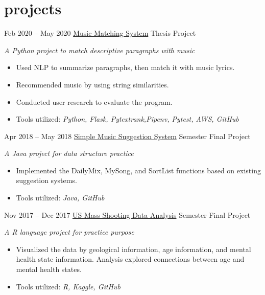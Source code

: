 \documentclass[]{friggeri-cv}
\begin{document}
\section{projects}
\begin{entrylist}
  \entry
    {Feb 2020 -- May 2020}
    {\href{https://github.com/liux2/Allegheny-College-CMPSC-COMP-liux2}{Music Matching System}}
    {Thesis Project}
    {\emph{A Python project to match descriptive paragraphs with music}
    \begin{itemize}[leftmargin=1.2em]
    \item Used NLP to summarize paragraphs, then match it with music lyrics.
    \item Recommended music by using string similarities.
    \item Conducted user research to evaluate the program.
    \item Tools utilized: \emph{Python, Flask, Pytextrank,Pipenv, Pytest, AWS, GitHub}
    \end{itemize}}
  \entry
    {Apr 2018 -- May 2018}
    {\href{https://github.com/TravisThomasAC/cs250-FinalProject-Team9}{Simple Music Suggestion System}}
    {Semester Final Project}
    {\emph{A Java project for data structure practice}
    \begin{itemize}[leftmargin=1.2em]
    \item Implemented the DailyMix, MySong, and SortList functions based on existing suggestion systems.
    \item Tools utilized: \emph{Java, GitHub}
    \end{itemize}}
  \entry
    {Nov 2017 -- Dec 2017}
    {\href{https://github.com/liux2/cs390f2017-project}{US Mass Shooting Data Analysis}}
    {Semester Final Project}
    {\emph{A R language project for practice purpose}
    \begin{itemize}[leftmargin=1.2em]
    \item Visualized the data by geological information, age information, and mental health state information. Analysis explored connections between age and mental health states.
    \item Tools utilized: \emph{R, Kaggle, GitHub}
    \end{itemize}}
\end{entrylist}
\end{document}
